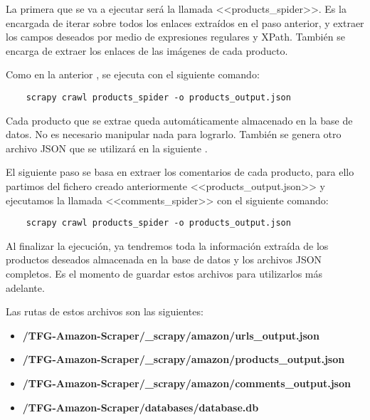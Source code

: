 La primera  que se va a ejecutar será la llamada <<products\_spider>>. Es la encargada de iterar sobre todos los enlaces extraídos en el paso anterior, y extraer los campos deseados por medio de expresiones regulares y XPath. También se encarga de extraer los enlaces de las imágenes de cada producto.

Como en la anterior , se ejecuta con el siguiente comando:

\begin{verbatim}
    scrapy crawl products_spider -o products_output.json
\end{verbatim}


Cada producto que se extrae queda automáticamente almacenado en la base de datos. No es necesario manipular nada para lograrlo. También se genera otro archivo JSON que se utilizará en la siguiente .

El siguiente paso se basa en extraer los comentarios de cada producto, para ello partimos del fichero creado anteriormente <<products\_output.json>> y ejecutamos la  llamada <<comments\_spider>> con el siguiente comando:

\begin{verbatim}
    scrapy crawl products_spider -o products_output.json
\end{verbatim}


Al finalizar la ejecución, ya tendremos toda la información extraída de los productos deseados almacenada en la base de datos y los archivos JSON completos.
Es el momento de guardar estos archivos para utilizarlos más adelante.

Las rutas de estos archivos son las siguientes:
\begin{itemize}
    \item \textbf{/TFG-Amazon-Scraper/\_scrapy/amazon/urls\_output.json}
    \item \textbf{/TFG-Amazon-Scraper/\_scrapy/amazon/products\_output.json}
    \item \textbf{/TFG-Amazon-Scraper/\_scrapy/amazon/comments\_output.json}
    \item \textbf{/TFG-Amazon-Scraper/databases/database.db}
\end{itemize}

